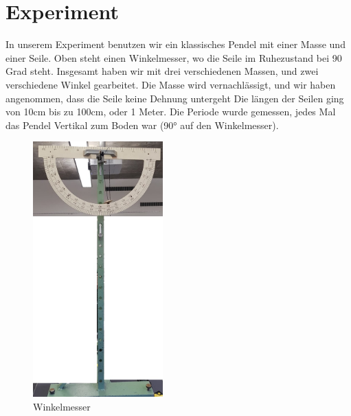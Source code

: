 \documentclass[12pt, a4paper, twoside]{article}
\begin{document}
        \section{Experiment}
        In unserem Experiment benutzen wir ein klassisches Pendel mit einer Masse und einer Seile. Oben steht einen Winkelmesser, wo die Seile im Ruhezustand bei 90 Grad steht. 
Insgesamt haben wir mit drei verschiedenen Massen, und zwei verschiedene Winkel gearbeitet. Die Masse wird vernachlässigt, und wir haben angenommen, dass die Seile keine Dehnung untergeht
Die längen der Seilen ging von 10cm bis zu 100cm, oder 1 Meter. 
Die Periode wurde gemessen, jedes Mal das Pendel Vertikal zum Boden war (90° auf den Winkelmesser). 
        \begin{figure}[h!]
            \centering
                \includegraphics[scale=0.25, width=5cm]{Winkelmesser.png}
                \caption{Winkelmesser}
        \end{figure}
\end{document}
